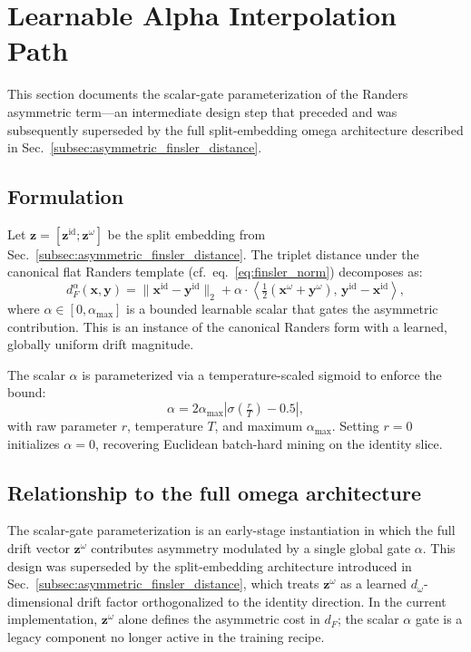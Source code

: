 \clearpage
\setcounter{page}{1}
\maketitlesupplementary

\section{Learnable Alpha Interpolation Path} \label{sec:suppl_alpha}
This section documents the scalar-gate parameterization of the Randers asymmetric term—an intermediate design step that preceded and was subsequently superseded by the full split-embedding omega architecture described in Sec.~\ref{subsec:asymmetric_finsler_distance}.

\subsection{Formulation} \label{subsec:suppl_alpha_formulation}
Let $\mathbf{z} = [\mathbf{z}^{\mathrm{id}}; \mathbf{z}^{\omega}]$ be the split embedding from Sec.~\ref{subsec:asymmetric_finsler_distance}. The triplet distance under the canonical flat Randers template (cf.\ eq.~\ref{eq:finsler_norm}) decomposes as:
\begin{equation}
    d_F^\alpha(\mathbf{x}, \mathbf{y}) = \|\mathbf{x}^{\mathrm{id}} - \mathbf{y}^{\mathrm{id}}\|_2 + \alpha \cdot \left\langle \tfrac{1}{2}(\mathbf{x}^{\omega} + \mathbf{y}^{\omega}),\, \mathbf{y}^{\mathrm{id}} - \mathbf{x}^{\mathrm{id}} \right\rangle,
    \label{eq:finsler_distance_alpha}
\end{equation}
where $\alpha \in [0, \alpha_{\max}]$ is a bounded learnable scalar that gates the asymmetric contribution. This is an instance of the canonical Randers form with a learned, globally uniform drift magnitude.

The scalar $\alpha$ is parameterized via a temperature-scaled sigmoid to enforce the bound:
\begin{equation}
    \alpha = 2\alpha_{\max} \left|\sigma\!\left(\tfrac{r}{T}\right) - 0.5\right|,
    \label{eq:finsler_distance_alpha_bound}
\end{equation}
with raw parameter $r$, temperature $T$, and maximum $\alpha_{\max}$. Setting $r{=}0$ initializes $\alpha{=}0$, recovering Euclidean batch-hard mining on the identity slice.

\subsection{Relationship to the full omega architecture}
The scalar-gate parameterization is an early-stage instantiation in which the full drift vector $\mathbf{z}^{\omega}$ contributes asymmetry modulated by a single global gate $\alpha$. This design was superseded by the split-embedding architecture introduced in Sec.~\ref{subsec:asymmetric_finsler_distance}, which treats $\mathbf{z}^{\omega}$ as a learned $d_\omega$-dimensional drift factor orthogonalized to the identity direction. In the current implementation, $\mathbf{z}^{\omega}$ alone defines the asymmetric cost in $d_F$; the scalar $\alpha$ gate is a legacy component no longer active in the training recipe.

